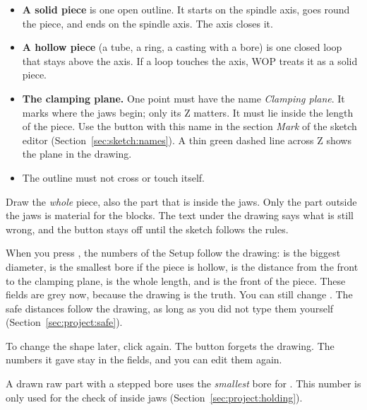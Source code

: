 \begin{itemize}
\item \textbf{A solid piece} is one open outline. It starts on the spindle axis, goes round the piece, and ends on the spindle axis. The axis closes it.
\item \textbf{A hollow piece} (a tube, a ring, a casting with a bore) is one closed loop that stays above the axis. If a loop touches the axis, WOP treats it as a solid piece.
\item \textbf{The clamping plane.} One point must have the name \emph{Clamping plane}. It marks where the jaws begin; only its Z matters. It must lie inside the length of the piece. Use the button with this name in the section \emph{Mark} of the sketch editor (Section~\ref{sec:sketch:names}). A thin green dashed line across Z shows the plane in the drawing.
\item The outline must not cross or touch itself.
\end{itemize}

Draw the \emph{whole} piece, also the part that is inside the jaws. Only the part outside the jaws is material for the blocks. The text under the drawing says what is still wrong, and the  button stays off until the sketch follows the rules.

When you press , the numbers of the Setup follow the drawing:  is the biggest diameter,  is the smallest bore if the piece is hollow,  is the distance from the front to the clamping plane,  is the whole length, and  is the front of the piece. These fields are grey now, because the drawing is the truth. You can still change . The safe distances follow the drawing, as long as you did not type them yourself (Section~\ref{sec:project:safe}).


To change the shape later, click  again. The button  forgets the drawing. The numbers it gave stay in the fields, and you can edit them again.

\begin{notebox}
A drawn raw part with a stepped bore uses the \emph{smallest} bore for . This number is only used for the check of inside jaws (Section~\ref{sec:project:holding}).
\end{notebox}

